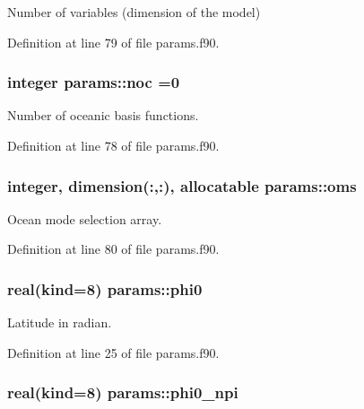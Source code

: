 Number of variables (dimension of the model) 



Definition at line 79 of file params.\-f90.

\hypertarget{classparams_acdb6ef89bcada9ba7b6b6bba575b60f4}{
\subsubsection[{noc}]{\setlength{\rightskip}{0pt plus 5cm}integer params\-::noc =0}}\label{classparams_acdb6ef89bcada9ba7b6b6bba575b60f4}


Number of oceanic basis functions. 



Definition at line 78 of file params.\-f90.

\hypertarget{classparams_a5e25e072992d5908eea5308243b7ec63}{
\subsubsection[{oms}]{\setlength{\rightskip}{0pt plus 5cm}integer, dimension(\-:,\-:), allocatable params\-::oms}}\label{classparams_a5e25e072992d5908eea5308243b7ec63}


Ocean mode selection array. 



Definition at line 80 of file params.\-f90.

\hypertarget{classparams_a7e58166ca3fb2153f781aa623c5c31e6}{
\subsubsection[{phi0}]{\setlength{\rightskip}{0pt plus 5cm}real(kind=8) params\-::phi0}}\label{classparams_a7e58166ca3fb2153f781aa623c5c31e6}


Latitude in radian. 



Definition at line 25 of file params.\-f90.

\hypertarget{classparams_a516e6c305e938087cfe780629c76ef64}{
\subsubsection[{phi0\-\_\-npi}]{\setlength{\rightskip}{0pt plus 5cm}real(kind=8) params\-::phi0\-\_\-npi}}\label{classparams_a516e6c305e938087cfe780629c76ef64}


